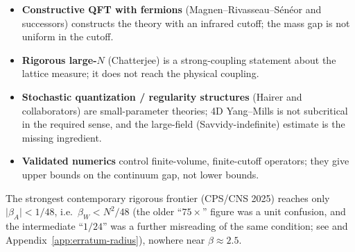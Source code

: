 \begin{itemize}
  The ceiling of the strong-coupling class itself has now been located \LT{} / \LM: the whole radius
  enters through one algebraic step, $\rho=N/2-C^*N\lvert\beta\rvert>0\iff\lvert\beta\rvert<1/(2C^*)$,
  in which the gain $N/2$ is the exact $\mathrm{SU}(N)$ Einstein constant (no slack at all) and every
  remaining $8(d-1)$ of slack sits in a \emph{single} triangle inequality whose configuration
  supremum $C^*$ is attained by the maximal centre-vortex configuration with a saturating mode. That
  supremum is $8.000000$ in $d=2$ --- exactly $8(d-1)$, saturated --- and lies in $[16,24]$ in $d=4$,
  so the class ceiling is $\beta\le1/32=0.03125$ (against the quoted $\beta_A=1/48$, i.e.\ the published
  constant is at most $1.5\times$ loose) and the unconditional bound $C^*\ge2(d-1)$ gives $\le1/12$. Either
  way the ceiling is $\Theta(1/d)$ and therefore \emph{decreases with dimension}: in $d=4$ the best
  member of the class stops about $19$--$20\times$ short of $\beta_c$ once the ceiling $1/32$ is converted from $\beta_A$ to $\beta_W$ (an earlier figure of $8.9\times$ made the same conversion slip). Crossing it requires replacing the
  pointwise-per-configuration $\Gamma_2$ step by an averaged or stopping-time Hessian, and
  integration by parts gives $E[\operatorname{Hess}]\preceq0$, so that replacement \emph{is} $H1$
  rather than a bypass. One structural remark is worth recording: the centre $u(1)$ direction has
  $\mathrm{Ric}=0$ while its Hessian is $+O(N^2\beta)>0$, so the Bakry--\'Emery criterion is false
  for every $\beta>0$ on $\mathrm{U}(N)$ and the passage to $\mathrm{SU}(N)$ (which splits off the
  centre) is not cosmetic.
\item \textbf{Constructive QFT with fermions} (Magnen--Rivasseau--S\'en\'eor and successors)
  constructs the theory with an infrared cutoff; the mass gap is not uniform in the cutoff.
\item \textbf{Rigorous large-$N$} (Chatterjee) is a strong-coupling statement about the lattice
  measure; it does not reach the physical coupling.
\item \textbf{Stochastic quantization / regularity structures} (Hairer and collaborators) are
  small-parameter theories; 4D Yang--Mills is not subcritical in the required sense, and the
  large-field (Savvidy-indefinite) estimate is the missing ingredient.
\item \textbf{Validated numerics} control finite-volume, finite-cutoff operators; they give upper
  bounds on the continuum gap, not lower bounds.
\end{itemize}
The strongest contemporary rigorous frontier (CPS/CNS 2025) reaches only
$\lvert\beta_A\rvert<1/48$, i.e.\ $\beta_W<N^2/48$ (the older ``$75\times$'' figure was
a unit confusion, and the intermediate ``$1/24$'' was a further misreading of the same condition;
see  and Appendix~\ref{app:erratum-radius}), nowhere near
$\beta\approx2.5$.

